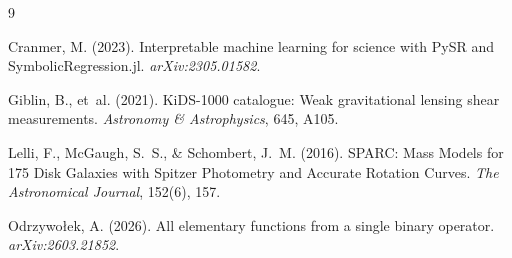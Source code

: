 \documentclass[12pt,a4paper]{article}
\begin{document}

\begin{thebibliography}{9}

Cranmer, M. (2023).
Interpretable machine learning for science with PySR and SymbolicRegression.jl.
\textit{arXiv:2305.01582}.

Giblin, B., et~al. (2021).
KiDS-1000 catalogue: Weak gravitational lensing shear measurements.
\textit{Astronomy \& Astrophysics}, 645, A105.

Lelli, F., McGaugh, S.~S., \& Schombert, J.~M. (2016).
SPARC: Mass Models for 175 Disk Galaxies with Spitzer Photometry
and Accurate Rotation Curves.
\textit{The Astronomical Journal}, 152(6), 157.

Odrzywołek, A. (2026).
All elementary functions from a single binary operator.
\textit{arXiv:2603.21852}.

\end{thebibliography}
\end{document}
